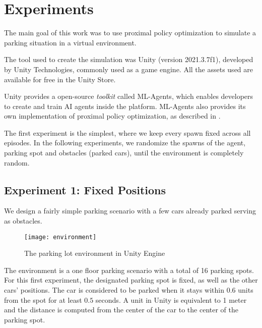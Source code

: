 \chapter{Experiments}
The main goal of this work was to use proximal policy optimization to simulate a parking situation in a virtual environment.

The tool used to create the simulation was Unity (version 2021.3.7f1), developed by Unity Technologies, commonly used as a game engine. All the assets used are available for free in the Unity Store.

Unity provides a open-source \textit{toolkit} called ML-Agents, which enables developers to create and train AI agents inside the platform. ML-Agents also provides its own implementation of proximal policy optimization, as described in \cite{schulman2017proximal}.

The first experiment is the simplest, where we keep every spawn fixed across all episodes. In the following experiments, we randomize the spawns of the agent, parking spot and obstacles (parked cars), until the environment is completely random.
\section{Experiment 1: Fixed Positions}
We design a fairly simple parking scenario with a few cars already parked serving as obstacles.
\begin{figure}
    \texttt{[image: environment]}
    \caption{The parking lot environment in Unity Engine}
\end{figure}
The environment is a one floor parking scenario with a total of 16 parking spots. For this first experiment, the designated parking spot is fixed, as well as the other cars' positions. The car is considered to be parked when it stays within $0.6$ units from the spot for at least $0.5$ seconds. A unit in Unity is equivalent to 1 meter and the distance is computed from the center of the car to the center of the parking spot.

